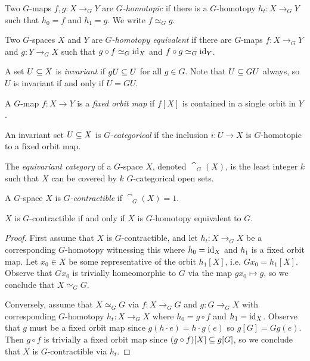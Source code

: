 \begin{definition}
    Two $G$-maps $f,g : X \to_G Y$ are \emph{$G$-homotopic} if there is a $G$-homotopy $h_t : X \to_G Y$ such that $h_0 = f$ and $h_1 = g$.
    We write $f \simeq_G g$.
\end{definition}

\begin{definition}
    Two $G$-spaces $X$ and $Y$ are \emph{$G$-homotopy equivalent} if there are $G$-maps $f : X \to_G Y$ and $g : Y \to_G X$ such that $g \circ f \simeq_G \operatorname{id}_X$ and $f \circ g \simeq_G \operatorname{id}_Y$.
\end{definition}

\begin{definition}
    A set $U \subseteq X$ is \emph{invariant} if $gU \subseteq U$ for all $g \in G$.
    Note that $U \subseteq GU$ always, so $U$ is invariant if and only if $U = GU$.
\end{definition}

\begin{definition}
    A $G$-map $f : X \to Y$ is a \emph{fixed orbit map} if $f[X]$ is contained in a single orbit in $Y$.
\end{definition}

\begin{definition}
    An invariant set $U \subseteq X$ is \emph{$G$-categorical} if the inclusion $i : U \to X$ is $G$-homotopic to a fixed orbit map.
\end{definition}

\begin{definition}\label{def:ecat}
    The \emph{equivariant category} of a $G$-space $X$, denoted $\cat_G(X)$, is the least integer $k$ such that $X$ can be covered by $k$ $G$-categorical open sets.
\end{definition}

\begin{definition}
    A $G$-space $X$ is \emph{$G$-contractible} if $\cat_G(X) = 1$.
\end{definition}

\begin{proposition}\label{prop:Gcon-iff-hom-equiv}
    $X$ is $G$-contractible if and only if $X$ is $G$-homotopy equivalent to $G$.
    \begin{proof}
        First assume that $X$ is $G$-contractible, and let $h_t : X \to_G X$ be a corresponding $G$-homotopy witnessing this where $h_0 = \operatorname{id}_X$ and $h_1$ is a fixed orbit map.
        Let $x_0 \in X$ be some representative of the orbit $h_1[X]$, i.e. $Gx_0 = h_1[X]$.
        Observe that $Gx_0$ is trivially homeomorphic to $G$ via the map $g x_0 \mapsto g$, so we conclude that $X \simeq_G G$.
        
        Conversely, assume that $X \simeq_G G$ via $f : X \to_G G$ and $g : G \to_G X$ with corresponding $G$-homotopy $h_t : X \to_G X$ where $h_0 = g \circ f$ and $h_1 = \operatorname{id}_X$.
        Observe that $g$ must be a fixed orbit map since $g(h \cdot e) = h \cdot g(e)$ so $g[G] = G g(e)$.
        Then $g \circ f$ is trivially a fixed orbit map since $(g \circ f)[X] \subseteq g[G]$, so we conclude that $X$ is $G$-contractible via $h_t$.
    \end{proof}
\end{proposition}

